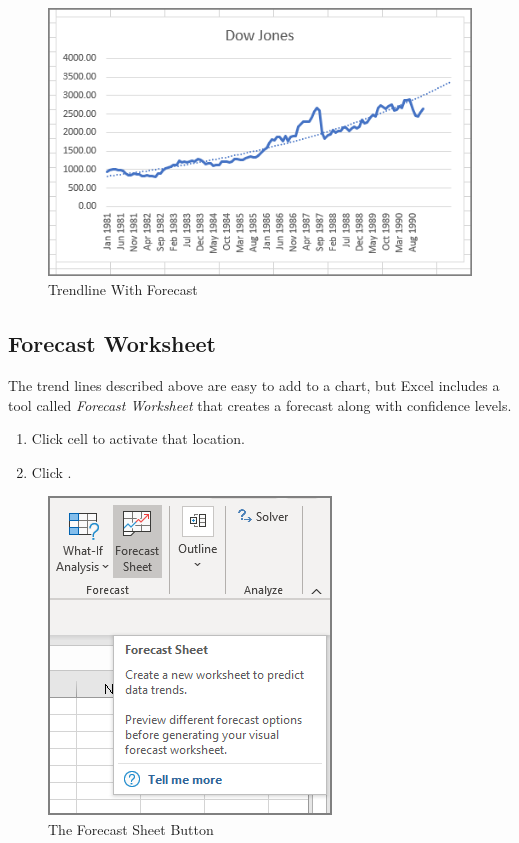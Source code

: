 \begin{enumerate}
	\begin{figure}[H]
		\centering
		\includegraphics[width=\maxwidth{.95\linewidth}]{gfx/ch08_fig10}
		\caption{Trendline With Forecast}
		\label{08:fig10}
	\end{figure}

\end{enumerate}

\subsection{Forecast Worksheet}

The trend lines described above are easy to add to a chart, but Excel includes a tool called \textit{Forecast Worksheet} that creates a forecast along with confidence levels.

\begin{enumerate}
	\item Click cell  to activate that location.
	\item Click .
\end{enumerate}

\begin{figure}[H]
	\centering
	\includegraphics[width=\maxwidth{.65\linewidth}]{gfx/ch08_fig11}
	\caption{The Forecast Sheet Button}
	\label{08:fig11}
\end{figure}


